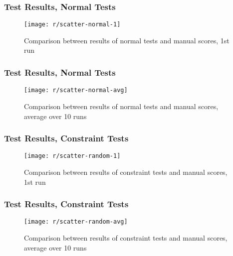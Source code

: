 \begin{frame}\frametitle{Test Results, Normal Tests}
    \begin{figure}
        \begin{minipage}{.85\textwidth}
            \texttt{[image: r/scatter-normal-1]}
            \caption{Comparison between results of normal tests and manual scores, 1st run}
        \end{minipage}
    \end{figure}
\end{frame}

\begin{frame}\frametitle{Test Results, Normal Tests}
    \begin{figure}
        \begin{minipage}{.85\textwidth}
            \texttt{[image: r/scatter-normal-avg]}
            \caption{Comparison between results of normal tests and manual scores, average over 10 runs}
        \end{minipage}
    \end{figure}
\end{frame}

\begin{frame}\frametitle{Test Results, Constraint Tests}
    \begin{figure}
        \begin{minipage}{.85\textwidth}
            \texttt{[image: r/scatter-random-1]}
            \caption{Comparison between results of constraint tests and manual scores, 1st run}
        \end{minipage}
    \end{figure}
\end{frame}

\begin{frame}\frametitle{Test Results, Constraint Tests}
    \begin{figure}
        \begin{minipage}{.85\textwidth}
            \texttt{[image: r/scatter-random-avg]}
            \caption{Comparison between results of constraint tests and manual scores, average over 10 runs}
        \end{minipage}
    \end{figure}
\end{frame}

\begin{frame}
\end{frame}

